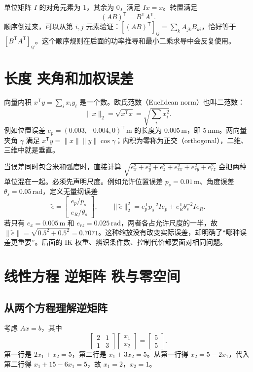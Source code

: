 单位矩阵 $I$ 的对角元素为 1，其余为 0，满足 $Ix=x$。转置满足
\begin{equation}
 (AB)^\mathsf T=B^\mathsf TA^\mathsf T.
\end{equation}
顺序倒过来，可以从第 $i,j$ 元素验证：$[(AB)^\mathsf T]_{ij}=\sum_k A_{jk}B_{ki}$，恰好等于 $[B^\mathsf TA^\mathsf T]_{ij}$。这个顺序规则在后面的功率推导和最小二乘求导中会反复使用。

\section{长度 夹角和加权误差}
向量内积 $x^\mathsf Ty=\sum_i x_i y_i$ 是一个数。欧氏范数（Euclidean norm）也叫二范数：
\begin{equation}
 \|x\|_2=\sqrt{x^\mathsf Tx}=\sqrt{\sum_i x_i^2}.
\end{equation}
例如位置误差 $e_p=(0.003,-0.004,0)^\mathsf T\,\mathrm m$ 的长度为 $0.005\,\mathrm m$，即 $5\,\mathrm{mm}$。两向量夹角 $\gamma$ 满足 $x^\mathsf Ty=\|x\|\|y\|\cos\gamma$；内积为零称为正交（orthogonal），二维、三维中就是垂直。

当误差同时包含米和弧度时，直接计算 $\sqrt{e_x^2+e_y^2+e_z^2+e_{rx}^2+e_{ry}^2+e_{rz}^2}$ 会把两种单位混在一起。必须先声明尺度。例如允许位置误差 $p_s=0.01\,\mathrm m$、角度误差 $\theta_s=0.05\,\mathrm{rad}$，定义无量纲误差
\begin{equation}
 \tilde e=\begin{bmatrix}e_p/p_s\\e_R/\theta_s\end{bmatrix},\qquad
 \|\tilde e\|_2^2=e_p^\mathsf T p_s^{-2}I e_p+e_R^\mathsf T\theta_s^{-2}I e_R.
\end{equation}
若只有 $e_x=0.005\,\mathrm m$ 和 $e_{rz}=0.025\,\mathrm{rad}$，两者各占允许尺度的一半，故 $\|\tilde e\|=\sqrt{0.5^2+0.5^2}=0.7071$。这种缩放没有改变实际误差，却明确了“哪种误差更重要”。后面的 IK 权重、辨识条件数、控制代价都要面对相同问题。

\section{线性方程 逆矩阵 秩与零空间}
\subsection{从两个方程理解逆矩阵}
考虑 $Ax=b$，其中
\begin{equation}
 \begin{bmatrix}2&1\\1&3\end{bmatrix}
 \begin{bmatrix}x_1\\x_2\end{bmatrix}
 =\begin{bmatrix}5\\5\end{bmatrix}.
\end{equation}
第一行是 $2x_1+x_2=5$，第二行是 $x_1+3x_2=5$。从第一行得 $x_2=5-2x_1$，代入第二行得 $x_1+15-6x_1=5$，故 $x_1=2$，$x_2=1$。

